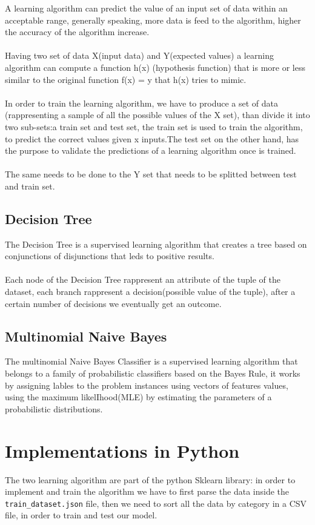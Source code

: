 \documentclass{article}
\begin{document}
A learning algorithm can predict the value of an input set of data within an acceptable range, generally speaking, more data is feed to the algorithm, higher the accuracy of the algorithm increase.\\\\
Having two set of data X(input data) and Y(expected values) a learning algorithm can compute a function h(x) (hypothesis function) that is more or less similar to the original function f(x) = y that h(x) tries to mimic.\\\\
In order to train the learning algorithm, we have to produce a set of data (rappresenting a sample of all the possible values of the X set), than divide it into two sub-sets:a train set and test set, the train set is used to train the algorithm, to predict the correct values given x inputs.The test set on the other hand, has the purpose to validate the predictions of a learning algorithm once is trained.\\\\
The same needs to be done to the Y set that needs to be splitted between test and train set.\\

\subsection{Decision Tree}\label{sec:decTree}

The Decision Tree is a supervised learning algorithm that creates a tree based on conjunctions of disjunctions that leds to positive results.\\\\
Each node of the Decision Tree rappresent an attribute of the tuple of the dataset, each branch rappresent a decision(possible value of the tuple), after a certain number of decisions we eventually get an outcome.

\subsection{Multinomial Naive Bayes }\label{sec:multnaiveBayes}
The multinomial Naive Bayes Classifier is a supervised learning algorithm that belongs to a family of probabilistic classifiers based on the Bayes Rule, it works by assigning lables to the problem instances using vectors of features values, using the maximum likelIhood(MLE) by estimating the parameters of a probabilistic distributions.


\section{Implementations in Python}\label{sec:intro}
The two learning algorithm are part of the python Sklearn library: in order to implement and train the algorithm we have to first parse the data inside the \verb|train_dataset.json| file, then we need to sort all the data by category in a CSV file, in order to train and test our model.
\end{document}
